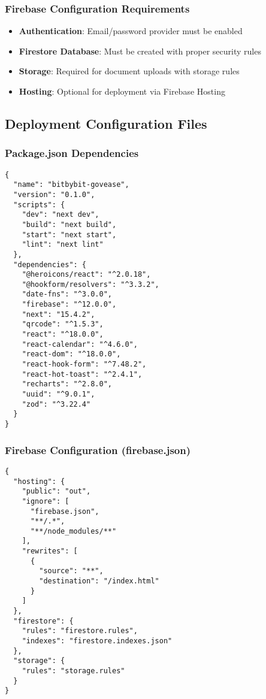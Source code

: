 \documentclass[12pt,a4paper]{article}
\begin{document}
\subsubsection{Firebase Configuration Requirements}

\begin{itemize}[leftmargin=*]
    \item \textbf{Authentication}: Email/password provider must be enabled
    \item \textbf{Firestore Database}: Must be created with proper security rules
    \item \textbf{Storage}: Required for document uploads with storage rules
    \item \textbf{Hosting}: Optional for deployment via Firebase Hosting
\end{itemize}

\subsection{Deployment Configuration Files}

\subsubsection{Package.json Dependencies}

\begin{verbatim}
{
  "name": "bitbybit-govease",
  "version": "0.1.0",
  "scripts": {
    "dev": "next dev",
    "build": "next build",
    "start": "next start",
    "lint": "next lint"
  },
  "dependencies": {
    "@heroicons/react": "^2.0.18",
    "@hookform/resolvers": "^3.3.2",
    "date-fns": "^3.0.0",
    "firebase": "^12.0.0",
    "next": "15.4.2",
    "qrcode": "^1.5.3",
    "react": "^18.0.0",
    "react-calendar": "^4.6.0",
    "react-dom": "^18.0.0",
    "react-hook-form": "^7.48.2",
    "react-hot-toast": "^2.4.1",
    "recharts": "^2.8.0",
    "uuid": "^9.0.1",
    "zod": "^3.22.4"
  }
}
\end{verbatim}

\subsubsection{Firebase Configuration (firebase.json)}

\begin{verbatim}
{
  "hosting": {
    "public": "out",
    "ignore": [
      "firebase.json",
      "**/.*",
      "**/node_modules/**"
    ],
    "rewrites": [
      {
        "source": "**",
        "destination": "/index.html"
      }
    ]
  },
  "firestore": {
    "rules": "firestore.rules",
    "indexes": "firestore.indexes.json"
  },
  "storage": {
    "rules": "storage.rules"
  }
}
\end{verbatim}
\end{document}
